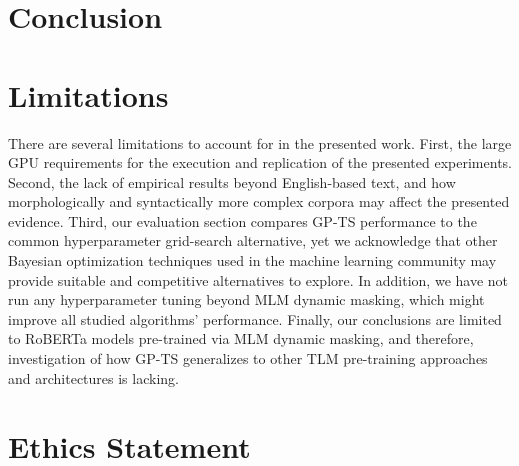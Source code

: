 \documentclass{article}
\begin{document}
\section{Conclusion}
\label{sec:conclusion}


\section*{Limitations}
%

There are several limitations to account for in the presented work.
First, the large GPU requirements for the execution and replication of the presented experiments.
Second, the lack of empirical results beyond English-based text,
and how morphologically and syntactically more complex corpora may affect the presented evidence.
Third, our evaluation section compares GP-TS performance to the common hyperparameter grid-search alternative,
yet we acknowledge that other Bayesian optimization techniques used in the machine learning community may provide suitable and competitive alternatives to explore.
In addition, we have not run any hyperparameter tuning beyond MLM dynamic masking, which might improve all studied algorithms' performance.
Finally, our conclusions are limited to RoBERTa models pre-trained via MLM dynamic masking,
and therefore, investigation of how GP-TS generalizes to other TLM pre-training approaches and architectures is lacking.

\section*{Ethics Statement}
\end{document}
